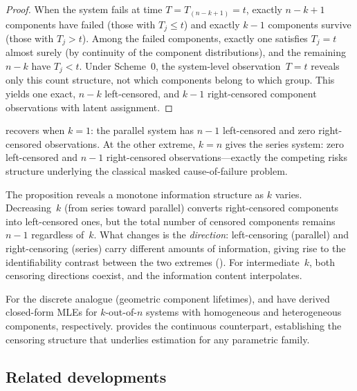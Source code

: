 \begin{proof}
When the system fails at time $T = T_{(n-k+1)} = t$, exactly $n - k + 1$
components have failed (those with $T_j \leq t$) and exactly $k - 1$
components survive (those with $T_j > t$).  Among the failed components,
exactly one satisfies $T_j = t$ almost surely (by continuity of the
component distributions), and the remaining $n - k$ have $T_j < t$.
Under Scheme~0, the system-level observation~$T = t$ reveals only this
count structure, not which components belong to which group.  This yields
one exact, $n - k$ left-censored, and $k - 1$ right-censored component
observations with latent assignment.
\end{proof}

 recovers  when
$k = 1$: the parallel system has $n - 1$ left-censored and zero
right-censored observations.  At the other extreme, $k = n$ gives the
series system: zero left-censored and $n - 1$ right-censored
observations---exactly the competing risks structure underlying the
classical masked cause-of-failure problem.

\begin{remark}
\label{rmk:info-hierarchy}
The proposition reveals a monotone information structure as $k$
varies.  Decreasing~$k$ (from series toward parallel) converts
right-censored components into left-censored ones, but the total number
of censored components remains $n - 1$ regardless of~$k$.  What changes
is the \emph{direction}: left-censoring (parallel) and right-censoring
(series) carry different amounts of information, giving rise to
the identifiability contrast between the two extremes
().  For intermediate~$k$, both censoring
directions coexist, and the information content interpolates.
\end{remark}

For the discrete analogue (geometric component lifetimes),
\citet{Jasinski2023} and \citet{Jasinski2024} have derived closed-form
MLEs for $k$-out-of-$n$ systems with homogeneous and heterogeneous
components, respectively.   provides the
continuous counterpart, establishing the censoring structure that
underlies estimation for any parametric family.

\subsection{Related developments}

